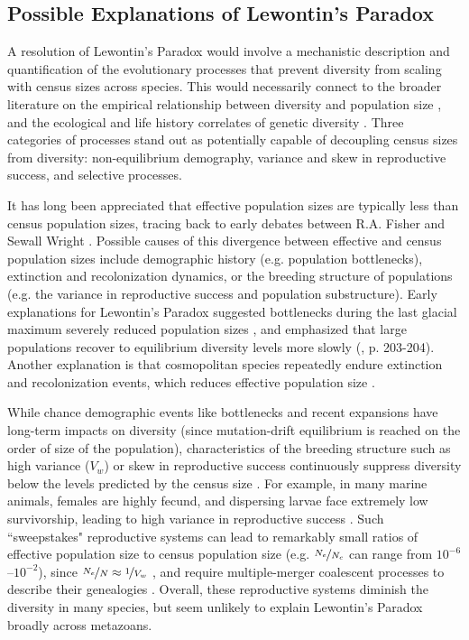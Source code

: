 \documentclass[9pt,lineno]{elife}
\begin{document}
\subsection{Possible Explanations of Lewontin's Paradox}

A resolution of Lewontin's Paradox would involve a mechanistic description and
quantification of the evolutionary processes that prevent diversity from
scaling with census sizes across species. This would necessarily connect to the
broader literature on the empirical relationship between diversity and
population size
\citep{Frankham1996-yb,Nei1984-zi,Soule1976-he,Leroy2021-gy}, and the
ecological and life history correlates of genetic diversity
\citep{Nevo1978-wh,Powell1975-lg,Nevo1984-hp}. Three categories of
processes stand out as potentially capable of decoupling census sizes from
diversity: non-equilibrium demography, variance and skew in reproductive
success, and selective processes.

It has long been appreciated that effective population sizes are typically less
than census population sizes, tracing back to early debates between R.A. Fisher
and Sewall Wright \citep{Fisher1947-tf,Wright1948-fj}. Possible causes of
this divergence between effective and census population sizes include
demographic history (e.g. population bottlenecks), extinction and
recolonization dynamics, or the breeding structure of populations (e.g. the
variance in reproductive success and population substructure). Early
explanations for Lewontin's Paradox suggested bottlenecks during the last
glacial maximum severely reduced population sizes
\citep{Kimura1984-ia,Ohta1973-pk,Nei1984-zi}, and emphasized that large
populations recover to equilibrium diversity levels more slowly
(\cite{Nei1984-zi}, \cite{Kimura1984-ia} p. 203-204). Another explanation is
that cosmopolitan species repeatedly endure extinction and recolonization
events, which reduces effective population size
\citep{Maruyama1980-xz,Slatkin1977-kd}. 

While chance demographic events like bottlenecks and recent expansions have
long-term impacts on diversity (since mutation-drift equilibrium is reached on
the order of size of the population), characteristics of the breeding structure
such as high variance ($V_w$) or skew in reproductive success continuously
suppress diversity below the levels predicted by the census size
\citep{Wright1938-tv}. For example, in many marine animals, females are
highly fecund, and dispersing larvae face extremely low survivorship, leading
to high variance in reproductive success
\citep{Waples2018-kb,Waples2013-wi,Hedgecock2011-ku,Hauser2008-fd}. Such
``sweepstakes" reproductive systems can lead to remarkably small ratios of
effective population size to census population size (e.g. $\nicefrac{N_e}{N_c}$
can range from $10^{-6}$--$10^{-2}$), since $\nicefrac{N_e}{N} \approx
\nicefrac{1}{V_w}$
\citep{Hedgecock1994-gs,Wright1938-tv,Nunney1993-ef,Nunney1996-wy}, and
require multiple-merger coalescent processes to describe their genealogies
\citep{Eldon2006-ui}. Overall, these reproductive systems diminish the
diversity in many species, but seem unlikely to explain Lewontin's Paradox
broadly across metazoans.
\end{document}
